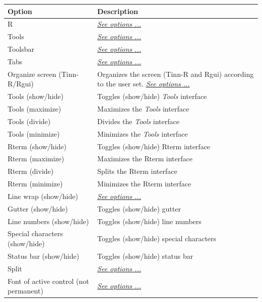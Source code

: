 \begin{scriptsize}
  \begin{tabularx}{\textwidth}{>{\hsize=0.7\hsize}X>{\hsize=0.7\hsize}X}\\
    \hline
    \textbf{Option} & \textbf{Description} \\
    \hline
    R & \textit{\href{\#menu\_view\_r}{See options ...}} \\
    Tools & \textit{\href{\#menu\_view\_tools}{See options ...}} \\
    Toolsbar & \textit{\href{\#menu\_view\_toolbars}{See options ...}} \\
    Tabs & \textit{\href{\#menu\_view\_tabs}{See options ...}} \\
    Organize screen (Tinn-R/Rgui) & Organizes the screen (Tinn-R and Rgui) according to the user set. \textit{\href{\#working\_app\_r}{See options ...}} \\
    Tools (show/hide) & Toggles (show/hide) \textit{Tools} interface \\
    Tools (maximize) & Maximizes the \textit{Tools} interface \\
    Tools (divide) & Divides the \textit{Tools} interface \\
    Tools (minimize) & Minimizes the \textit{Tools} interface \\
    Rterm (show/hide) & Toggles (show/hide) Rterm interface \\
    Rterm (maximize) & Maximizes the Rterm interface \\
    Rterm (divide) & Splits the Rterm interface \\
    Rterm (minimize) & Minimizes the Rterm interface \\
    Line wrap (show/hide) & \textit{\href{\#menu\_view\_linewrap}{See options ...}} \\
    Gutter (show/hide) & Toggles (show/hide) gutter \\
    Line numbers (show/hide) & Toggles (show/hide) line numbers \\
    Special characters (show/hide) & Toggles (show/hide) special characters \\
    Status bar (show/hide) & Toggles (show/hide) status bar \\
    Split & \textit{\href{\#menu\_view\_split}{See options ...}} \\
    Font of active control (not permanent) & \textit{\href{\#menu\_view\_fontsize}{See options ...}} \\
    \hline
  \end{tabularx}
\end{scriptsize}


